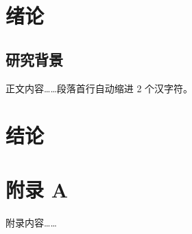 \documentclass[master]{cugthesis}
\begin{document}
    \makefrontpages

    \chapter{绪论}
    \section{研究背景}
    正文内容……段落首行自动缩进 2 个汉字符。

    \chapter{结论}

    \backmatter
    \cugthesisacknowledgements      %

    \appendix
    \chapter{附录 A}
    附录内容……
\end{document}
